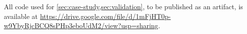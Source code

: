 All code used for \cref{sec:case-study,sec:validation}, to be published as an artifact, is available at \url{https://drive.google.com/file/d/1mFjHT0p-w9YbyRjcBCQ8sPHp3eboUdM2/view?usp=sharing}.

\begin{comment}
  Static program analysis is a difficult task, made even harder when the well-established
  stack-based function call paradigm is not respected. In particular,
  exception handling often includes violations of program control flow not visible
  from within the source code or binary of the program.
  Even structured exception handling, such as that provided by \Cpp,
  requires information external to the binary in order to properly analyze it.
  Modeling this information requires, at a minimum,
  semantics for the library functions that perform the exception handling process.
  
  \subsection{Contribution}
  This paper provides a tool for static, interprocedural,
  \Cpp-exception-aware control flow analysis.
  Specifically, the production of \acp{eicfg}.
  It can do this even in the presence of recursion and some forms of indirect control flow.
  The tool is guaranteed to provide overapproximative results for those paths of execution it can resolve, with those paths it cannot resolve clearly marked in its output.
  The resulting \ac{eicfg} documents the direct exception-handling-related components of the state of the program, such as exception objects currently allocated, number of uncaught exceptions, and which exceptions are currently in a caught state.
  This is done using an abstract interpretation-based methodology in a restricted domain that only concerns itself with the necessary components of program state required to perform function calls and exception handling.
  
  \todo\dots
  
  It operates using a recursive-descent rather than linear sweep methodology.
  
  \subsection{Motivation}
  \Acp{eicfg} 
  
  Overapproximativity is necessary in order to provide complete coverage.
  Alternate methods of uncovering exceptional state generally rely on
  

\end{comment}
